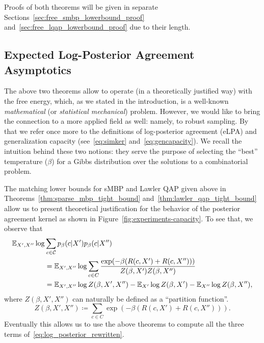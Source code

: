 \myremark Proofs of both theorems will be given in separate Sections~\ref{sec:free_smbp_lowerbound_proof}
and~\ref{sec:free_lqap_lowerbound_proof} due to their length.

\subsection{Expected Log-Posterior Agreement Asymptotics}

The above two theorems allow to operate (in a theoretically justified way) with
the free energy, which, as we stated in the introduction, is
a well-known \textit{mathematical} (or \textit{statistical mechanical}) problem.
However, we would like to bring the connection to a more applied field as well:
namely, to robust sampling. By that we refer once more to the definitions of
log-posterior agreement (eLPA) and generalization capacity
(see~\eqref{eq:simker} and~\eqref{eq:gencapacity}). We recall the intuition
behind these two notions: they serve the purpose of selecting the ``best''
temperature ($\beta$) for a Gibbs distribution over the solutions to a
combinatorial problem.

The matching lower bounds for sMBP and Lawler QAP given above in 
Theorems~\ref{thm:sparse_mbp_tight_bound}
and~\ref{thm:lawler_qap_tight_bound} 
allow us to present theoretical justification for the behavior of the
posterior agreement kernel as shown in Figure~\ref{fig:experiments-capacity}.
To see that, we observe that
\begin{align}
\label{eq:log_posterior_rewritten}
  \mathbb{E}_{X', X''} \log &\sum_{c \in {\cal C}} p_\beta(c|X') p_\beta(c|X'') \\ \notag
    &= \mathbb{E}_{X',X''} \log \sum_{c \in C} \frac{\exp(-\beta (R(c, X') + R(c,X'')))}{Z(\beta, X') Z(\beta, X'')} \\
    &= \mathbb{E}_{X',X''} \log Z(\beta, X', X'') - \mathbb{E}_{X'} \log Z(\beta, X') 
      - \mathbb{E}_{X''} \log Z(\beta, X''),
\end{align}
where $Z(\beta, X',X'')$ can naturally be defined as a ``partition function''.
\begin{equation}
  Z(\beta, X', X'') \coloneqq \sum_{c \in C} \exp(-\beta (R(c, X') + R(c,X''))).
\end{equation}
Eventually this allows us to use the above theorems to compute all the three
terms of~\eqref{eq:log_posterior_rewritten}.

